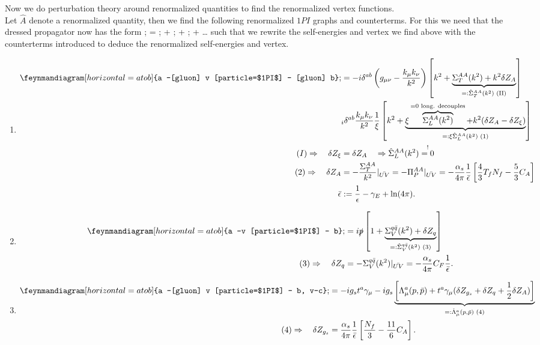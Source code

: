 Now we do perturbation theory around renormalized quantities to find the renormalized vertex functions.\\
Let $\hat{A}$ denote a renormalized quantity, then we find the following renormalized $1PI$ graphs and counterterms.
For this we need that the dressed propagator now has the form 
\bse 
{}; = ; + ; + ; + \dots 
\ese 
such that we rewrite the self-energies and vertex we find above with the counterterms introduced to deduce the renormalized self-energies and vertex.
\begin{enumerate}
	\item 
	\begin{align*}
		\feynmandiagram[horizontal=a to b]{a --[gluon] v [particle=$1PI$] -- [gluon] b}; &=-i \delta^{ab} \left(g\munu - \frac{k_\mu k_\nu}{k^2}\right) \left[k^2 + \underbrace{\Sigma^{AA}_T(k^2)+k^2 \delta Z_A}_{=: \hat{\Sigma}^{AA}_T(k^2) \text{ (II)} }\right] \\
		&_ i \delta^{ab} \frac{k_\mu k_\nu}{k^2} \frac{1}{\xi} \left[k^2 + \underbrace{\xi \overbrace{\Sigma^{AA}_L(k^2)}^{=0 \text{ long. decouples}}+ k^2 (\delta Z_A-\delta Z_\xi)}_{=: \xi \hat{\Sigma}^{AA}_L(k^2) \text{ (1)} }\right]\\
		(I)\Rightarrow \quad \delta Z_\xi &=  \delta Z_A \quad \Rightarrow \hat{\Sigma}^{AA}_L(k^2) \stackrel{!}{=0} \\
		(2)\Rightarrow \quad \delta Z_A &= - \frac{\Sigma^{AA}_T}{k^2} |_{\bar{UV}} = - \Pi^{AA}_P |_{\bar{UV}} = - \frac{\alpha_s}{4 \pi} \frac{1}{\bar{ \epsilon}} \left[ \frac{4}{3} T_f N_f - \frac{5}{3} C_A\right] \\
		\bar{\epsilon} &:= \frac{1}{\epsilon} - \gamma_E + \ln(4\pi).
	\end{align*}
\item 
\begin{align*}
	\feynmandiagram[horizontal=a  to b]{a --v [particle=$1PI$] -- b}; &= i \slashed{p} \left[1 + \underbrace{\Sigma^{q \bar{q}}_V (k^2) +\delta Z_q}_{=:\hat{\Sigma}^{q \bar{q}}_V(k^2) \text{ (3)}} \right]\\
	(3)\Rightarrow \quad \delta Z_q &= - \Sigma^{q\bar{ q}}_V (k^2) |_{\bar{UV}} = - \frac{\alpha_s}{4 \pi} C_F \frac{1}{\bar{\epsilon}}.
\end{align*}
\item 
\begin{align*}
	\feynmandiagram[horizontal=a to b]{a --[gluon] v [particle=$1PI$] -- b, v--c}; &= -i g_s t^a \gamma_\mu - ig_s \underbrace{\left[\Lambda^a_\mu (p,\bar{p}) + t^a \gamma_\mu (\delta Z_{g_s} + \delta Z_q + \half \delta Z_A) \right]}_{=: \hat{\Lambda}^a_\mu(p,\bar{p}) \text{ (4)} }\\
		(4) \Rightarrow \quad \delta Z_{g_s} &= \frac{\alpha_s}{4\pi} \frac{1}{\bar{\epsilon}} \left[ \frac{N_f}{3} - \frac{11}{6} C_A\right].
\end{align*}
\end{enumerate}
